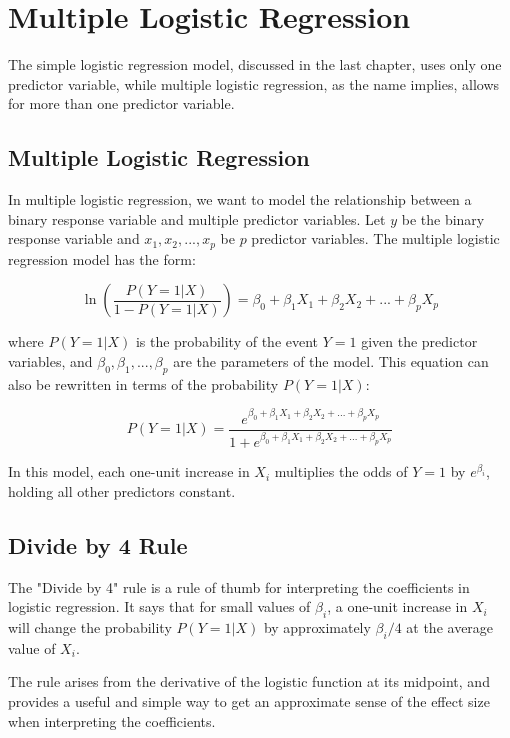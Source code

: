\chapter{Multiple Logistic Regression}

The simple logistic regression model, discussed in the last chapter, uses only one predictor variable, while multiple logistic regression, as the name implies, allows for more than one predictor variable.

\section{Multiple Logistic Regression}
In multiple logistic regression, we want to model the relationship between a binary response variable and multiple predictor variables. Let $y$ be the binary response variable and $x_1, x_2, ..., x_p$ be $p$ predictor variables. The multiple logistic regression model has the form:

\begin{equation*}
\ln \left( \frac{P(Y=1|X)}{1-P(Y=1|X)} \right) = \beta_0 + \beta_1X_1 + \beta_2X_2 + ... + \beta_pX_p
\end{equation*}

where $P(Y=1|X)$ is the probability of the event $Y=1$ given the predictor variables, and $\beta_0, \beta_1, ..., \beta_p$ are the parameters of the model. This equation can also be rewritten in terms of the probability $P(Y=1|X)$:

\begin{equation*}
P(Y=1|X) = \frac{e^{\beta_0 + \beta_1X_1 + \beta_2X_2 + ... + \beta_pX_p}}{1 + e^{\beta_0 + \beta_1X_1 + \beta_2X_2 + ... + \beta_pX_p}}
\end{equation*}

In this model, each one-unit increase in $X_i$ multiplies the odds of $Y=1$ by $e^{\beta_i}$, holding all other predictors constant.

\section{Divide by 4 Rule}
The "Divide by 4" rule is a rule of thumb for interpreting the coefficients in logistic regression. It says that for small values of $\beta_i$, a one-unit increase in $X_i$ will change the probability $P(Y=1|X)$ by approximately $\beta_i / 4$ at the average value of $X_i$.

The rule arises from the derivative of the logistic function at its midpoint, and provides a useful and simple way to get an approximate sense of the effect size when interpreting the coefficients.